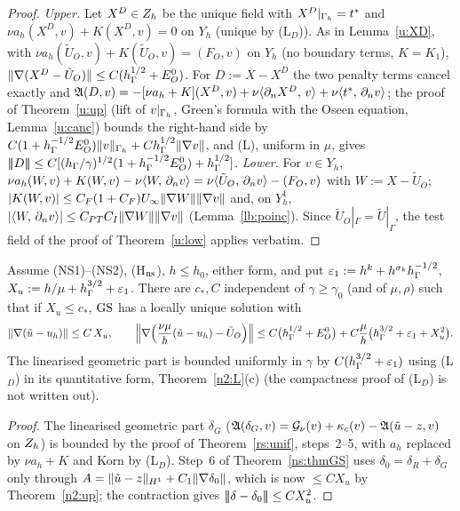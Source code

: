 \begin{proof}
\emph{Upper.} Let $X^D\in Z_h$ be the unique field with $X^D|_{\Gamma_h}=t^\ast$ and $\nu a_h(X^D,v)+K(X^D,v)=0$ on $Y_h$ (unique by (L$_D$)). As in Lemma~\ref{u:XD}, with $\nu a_h(\tilde U_O,v)+K(\tilde U_O,v)=(F_O,v)$ on $Y_h$ (no boundary terms, $K=K_1$), $\lVert \nabla(X^D-\tilde U_O)\rVert\le C(h_\Gamma^{1/2}+E^0_O)$. For $D:=X-X^D$ the two penalty terms cancel exactly and $\mathfrak A(D,v)=-[\nu a_h+K](X^D,v)+\nu\langle \partial_n X^D,\, v\rangle+\nu\langle t^\ast,\, \partial_n v\rangle$; the proof of Theorem~\ref{u:up} (lift of $v|_{\Gamma_h}$, Green's formula with the Oseen equation, Lemma~\ref{u:canc}) bounds the right-hand side by $C(1+h_\Gamma^{-1/2}E^0_O)\lVert v\rVert_{\Gamma_h}+Ch_\Gamma^{1/2}\lVert \nabla v\rVert$, and (L), uniform in $\mu$, gives $|\!|\!|D|\!|\!|\le C[(h_\Gamma/\gamma)^{1/2}(1+h_\Gamma^{-1/2}E^0_O)+h_\Gamma^{1/2}]$.
\emph{Lower.} For $v\in Y_h$, $\nu a_h(W,v)+K(W,v)-\nu\langle W,\, \partial_n v\rangle=\nu\langle \tilde U_O,\, \partial_n v\rangle-(F_O,v)$ with $W:=X-\tilde U_O$; $|K(W,v)|\le C_F(1+C_F)U_\infty\lVert \nabla W\rVert\lVert \nabla v\rVert$ and, on $Y_h^1$, $|\langle W,\, \partial_n v\rangle|\le C_{PT}C_I\lVert \nabla W\rVert\lVert \nabla v\rVert$ (Lemma~\ref{lb:poinc}). Since $\tilde U_O|_\Gamma=\tilde U|_\Gamma$, the test field of the proof of Theorem~\ref{u:low} applies verbatim.
\end{proof}

\begin{theorem}\label{n2:unif:thm}
Assume (NS1)--(NS2), (H$_{\rm ns}$), $h\le h_0$, either form, and put $\varepsilon_1:=h^k+h^{\sigma_k}h_\Gamma^{-1/2}$, $X_u:=h/\mu+h_\Gamma^{3/2}+\varepsilon_1$. There are $c_\ast,C$ independent of $\gamma\ge\gamma_0$ (and of $\mu,\rho$) such that if $X_u\le c_\ast$, $\mathrm{GS}$ has a locally unique solution with
\[
\lVert \nabla(\tilde u-u_h)\rVert\le C\,X_u,\qquad
\Bigl\|\nabla\Bigl(\frac{\nu\mu}h(\tilde u-u_h)-\tilde U_O\Bigr)\Bigr\|\le C\bigl(h_\Gamma^{1/2}+E^0_O\bigr)+C\frac\mu h\bigl(h_\Gamma^{3/2}+\varepsilon_1+X_u^2\bigr).
\]
The linearised geometric part is bounded uniformly in $\gamma$ by $C(h_\Gamma^{3/2}+\varepsilon_1)$ using (L$_D$) in its quantitative form, Theorem~\ref{n2:L}(c) (the compactness proof of (L$_D$) is not written out).
\end{theorem}

\begin{proof}
The linearised geometric part $\delta_G$ ($\mathfrak A(\delta_G,v)=\mathcal G_\nu(v)+\kappa_c(v)-\mathfrak A(\tilde u-z,v)$ on $Z_h$) is bounded by the proof of Theorem~\ref{rs:unif}, steps~2--5, with $a_h$ replaced by $\nu a_h+K$ and Korn by (L$_D$). Step~6 of Theorem~\ref{ns:thmGS} uses $\delta_0=\delta_R+\delta_G$ only through $A=\lVert \tilde u-z\rVert_{H^1}+C_1\lVert \nabla\delta_0\rVert$, which is now $\le CX_u$ by Theorem~\ref{n2:up}; the contraction gives $|\!|\!|\delta-\delta_0|\!|\!|\le CX_u^2$.
\end{proof}

